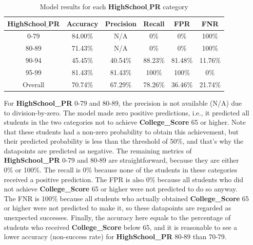 \documentclass[
]{article}
\begin{document}
\begin{table}[ht]
    \centering
    \begin{tabular}{|c|c|c|c|c|c|}
    \hline
    \textbf{HighSchool$\_$PR}   & Accuracy & Precision & Recall  & FPR     & FNR     \\ \hline
     0-79   & 84.00\% & N/A     & 0\%     & 0\%     & 100\% \\ \hline
    80-89   & 71.43\% & N/A     & 0\%     & 0\%     & 100\% \\ \hline
    90-94   & 45.45\% & 40.54\% & 88.23\% & 81.48\% & 11.76\% \\ \hline
    95-99   & 81.43\% & 81.43\% & 100\%   & 100\%   & 0\%     \\ \hline
    Overall & 70.74\% & 67.29\% & 78.26\% & 36.46\% & 21.74\% \\ \hline
    \end{tabular}
    \caption{Model results for each \textbf{HighSchool$\_$PR} category}
    \label{tab:breakdown-pr}
\end{table}

For \textbf{HighSchool\_PR} 0-79 and 80-89, the precision is not
available (N/A) due to division-by-zero. The model made zero positive
predictions, i.e., it predicted all students in the two categories not
to achieve \textbf{College\_Score} 65 or higher. Note that these
students had a non-zero probability to obtain this achievement, but
their predicted probability is less than the threshold of 50\%, and
that's why the datapoints are predicted as negative. The remaining
metrics of \textbf{HighSchool\_PR} 0-79 and 80-89 are straightforward,
because they are either 0\% or 100\%. The recall is 0\% because none of
the students in these categories received a positive prediction. The FPR
is also 0\% because all students who did not achieve
\textbf{College\_Score} 65 or higher were not predicted to do so anyway.
The FNR is 100\% because all students who actually obtained
\textbf{College\_Score} 65 or higher were not predicted to make it, so
these datapoints are regarded as unexpected successes. Finally, the
accuracy here equals to the percentage of students who received
\textbf{College\_Score} below 65, and it is reasonable to see a lower
accuracy (non-success rate) for \textbf{HighSchool\_PR} 80-89 than
70-79.
\end{document}
